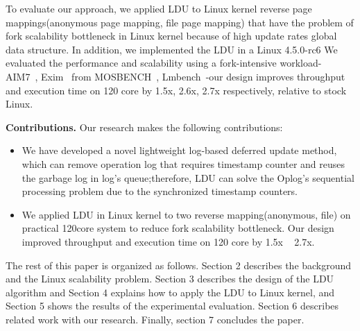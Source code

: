 To evaluate our approach, we applied LDU to Linux kernel reverse
page mappings(anonymous page mapping, file page mapping) that have the
problem of fork scalability bottleneck in Linux kernel because of
high update rates global data structure.
In addition, we implemented the LDU in a Linux 4.5.0-rc6
We evaluated the performance and scalability using a fork-intensive workload-
AIM7~\cite{AIM7Benchmark}, Exim~\cite{Exim} from MOSBENCH~\cite{MOSBENCH},
Lmbench~\cite{mcvoy1996lmbench}-our design improves throughput and execution
time on 120 core by 1.5x, 2.6x, 2.7x respectively, relative to stock Linux.


\textbf{Contributions.} Our research makes the following contributions:
\begin{itemize}
\item We have developed a novel lightweight log-based deferred update method,
which can remove operation log that requires timestamp counter and reuses
the garbage log in log's queue;therefore, LDU can solve the Oplog's sequential processing problem due to the synchronized timestamp counters.
\item 
We applied LDU in Linux kernel to two reverse mapping(anonymous, file) on
practical 120core system to reduce fork scalability bottleneck.
Our design improved throughput and execution time on 120 core by 1.5x ~ 2.7x.
\end{itemize}


The rest of this paper is organized as follows.
Section 2 describes the background and the Linux scalability problem.
Section 3 describes the design of the LDU algorithm and 
Section 4 explains how to apply the LDU to Linux kernel, and
Section 5 shows the results of the experimental evaluation. 
Section 6 describes related work with our research.
Finally, section 7 concludes the paper.
